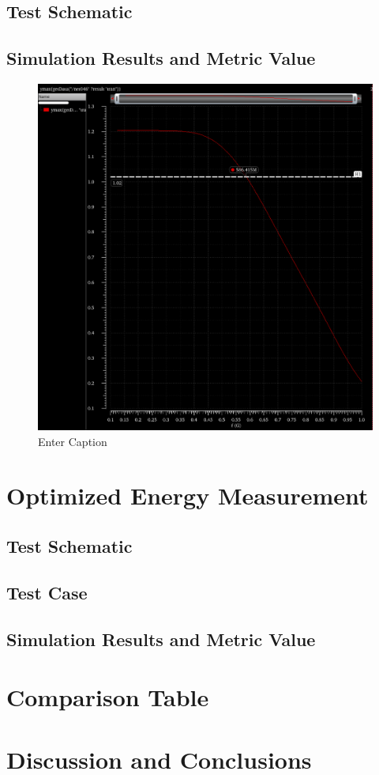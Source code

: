 \documentclass[12pt]{article}
\begin{document}
\subsection{Test Schematic}



\newpage

\subsection{Simulation Results and Metric Value}

\begin{figure}
    \centering
    \includegraphics[width=0.5\linewidth]{writeup//figures/max_frequencies_optimized.png}
    \caption{Enter Caption}
\end{figure}

\newpage

\section{Optimized Energy Measurement}
\subsection{Test Schematic}



\newpage

\subsection{Test Case}



\newpage

\subsection{Simulation Results and Metric Value}



\newpage

\section{Comparison Table}



\newpage

\section{Discussion and Conclusions}
\end{document}
